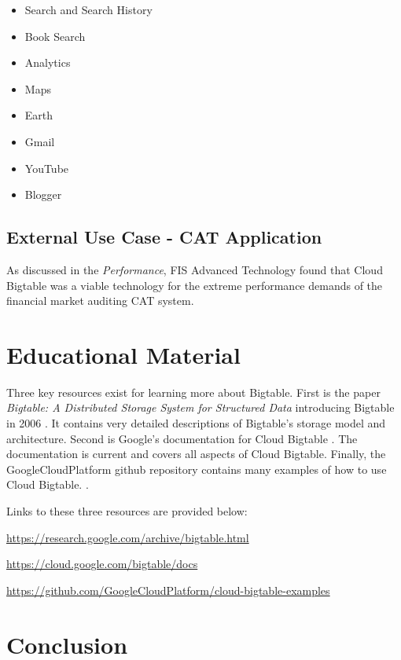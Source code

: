 \documentclass[9pt,twocolumn,twoside]{styles/osajnl}
\begin{document}
\vspace{-\topsep}
\begin{itemize}
\item Search and Search History
\item Book Search
\item Analytics  
\item Maps
\item Earth
\item Gmail 
\item YouTube
\item Blogger

\end{itemize}
\vspace{-\topsep}


\subsection{External Use Case - CAT Application}

As discussed in the \emph{Performance}, FIS Advanced Technology found that Cloud Bigtable was a viable technology for the extreme performance demands of the financial market auditing CAT system. \cite{www-fis}

\section{Educational Material}

Three key resources exist for learning more about Bigtable. First is the paper \emph{Bigtable: A Distributed Storage System for Structured Data} introducing Bigtable in 2006 \cite{introbigtable}.  It contains very detailed descriptions of Bigtable's storage model and architecture. Second is Google's documentation for Cloud Bigtable \cite{www-bigtabledocumentation}.  The documentation is current and covers all aspects of Cloud Bigtable. Finally, the GoogleCloudPlatform github repository contains many examples of how to use Cloud Bigtable. \cite{git-googlecloud}.

Links to these three resources are provided below:

\url{https://research.google.com/archive/bigtable.html}
 
\url{https://cloud.google.com/bigtable/docs}

\url{https://github.com/GoogleCloudPlatform/cloud-bigtable-examples}

\section{Conclusion}
\end{document}
